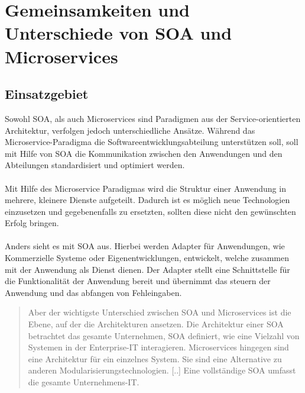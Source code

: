 \chapter[Gemeinsamkeiten und Unterschiede]{Gemeinsamkeiten und Unterschiede von SOA und Microservices}
\label{chap:Unterschiede}

\section{Einsatzgebiet}
\label{sec:Einsatzgebiet}
Sowohl SOA, als auch Microservices sind Paradigmen aus der Service-orientierten Architektur, verfolgen jedoch unterschiedliche Ansätze. Während das Microservice-Paradigma die Softwareentwicklungsabteilung unterstützen soll, soll mit Hilfe von SOA die Kommunikation zwischen den Anwendungen und den Abteilungen standardisiert und optimiert werden.
\\\\
Mit Hilfe des Microservice Paradigmas wird die Struktur einer Anwendung in mehrere, kleinere Dienste aufgeteilt. Dadurch ist es möglich neue Technologien einzusetzen und gegebenenfalls zu ersetzten, sollten diese nicht den gewünschten Erfolg bringen.
\\\\
Anders sieht es mit SOA aus. Hierbei werden Adapter für Anwendungen, wie Kommerzielle Systeme oder Eigenentwicklungen, entwickelt, welche zusammen mit der Anwendung als Dienst dienen. Der Adapter stellt eine Schnittstelle für die Funktionalität der Anwendung bereit und übernimmt das steuern der Anwendung und das abfangen von Fehleingaben.

\begin{quotation}
	\frqq Aber der wichtigste Unterschied zwischen SOA und Microservices ist die Ebene, auf der die Architekturen ansetzen. Die Architektur einer SOA betrachtet das gesamte Unternehmen, SOA definiert, wie eine Vielzahl von Systemen in der Enterprise-IT interagieren. Microservices hingegen sind eine Architektur für ein einzelnes System. Sie sind eine Alternative zu anderen Modularisierungstechnologien. [..] Eine vollständige SOA umfasst die gesamte Unternehmens-IT.\flqq\ \cite[S. 90]{EWolff2016:Microservices}
\end{quotation}

